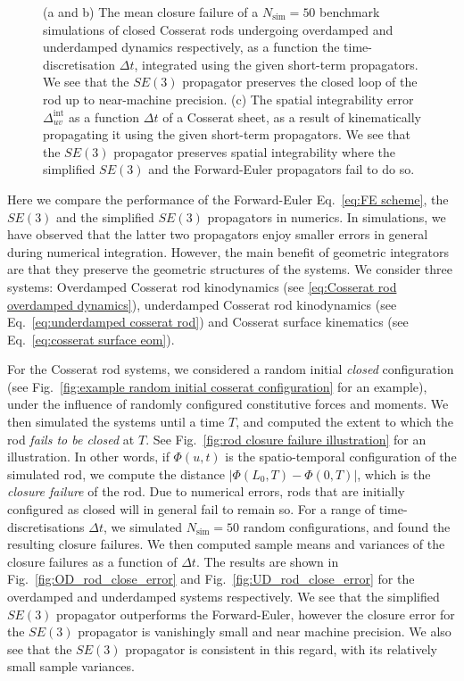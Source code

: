 \begin{figure}
    \caption[  ]
    {\small (a and b) The mean closure failure of a $N_\text{sim} = 50$ benchmark simulations of closed Cosserat rods undergoing overdamped and underdamped dynamics respectively, as a function the time-discretisation $\Delta t$, integrated using the given short-term propagators. We see that the $SE(3)$ propagator preserves the closed loop of the rod up to near-machine precision. (c) The spatial integrability error $\Delta^\text{int}_{uv}$ as a function $\Delta t$ of a Cosserat sheet, as a result of kinematically propagating it using the given short-term propagators. We see that the $SE(3)$ propagator preserves spatial integrability where the simplified $SE(3)$ and the Forward-Euler propagators fail to do so.} 
\end{figure}

Here we compare the performance of the Forward-Euler Eq.~\ref{eq:FE scheme}, the $SE(3)$ and the simplified $SE(3)$ propagators in numerics. In simulations, we have observed that the latter two propagators enjoy smaller errors in general during numerical integration. However, the main benefit of geometric integrators are that they preserve the geometric structures of the systems. We consider three systems: Overdamped Cosserat rod kinodynamics (see \ref{eq:Cosserat rod overdamped dynamics}), underdamped Cosserat rod kinodynamics (see Eq.~\ref{eq:underdamped cosserat rod}) and Cosserat surface kinematics (see Eq.~\ref{eq:cosserat surface eom}).

For the Cosserat rod systems, we considered a random initial \textit{closed} configuration (see Fig.~\ref{fig:example random initial cosserat configuration} for an example), under the influence of randomly configured constitutive forces and moments. We then simulated the systems until a time $T$, and computed the extent to which the rod \textit{fails to be closed} at $T$. See Fig.~\ref{fig:rod closure failure illustration} for an illustration. In other words, if $\Phi(u,t)$ is the spatio-temporal configuration of the simulated rod, we compute the distance $|\Phi(L_0, T) - \Phi(0, T)|$, which is the \textit{closure failure} of the rod. Due to numerical errors, rods that are initially configured as closed will in general fail to remain so. For a range of time-discretisations $\Delta t$, we simulated $N_\text{sim} = 50$ random configurations, and found the resulting closure failures. We then computed sample means and variances of the closure failures as a function of $\Delta t$. The results are shown in Fig.~\ref{fig:OD_rod_close_error} and Fig.~\ref{fig:UD_rod_close_error} for the overdamped and underdamped systems respectively. We see that the simplified $SE(3)$ propagator outperforms the Forward-Euler, however the closure error for the $SE(3)$ propagator is vanishingly small and near machine precision. We also see that the $SE(3)$ propagator is consistent in this regard, with its relatively small sample variances.

